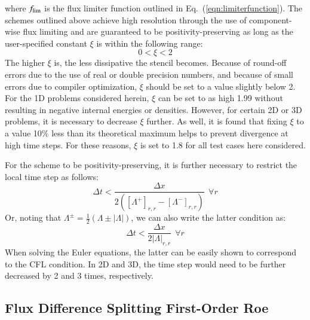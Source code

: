 \documentclass{warpdoc}
\begin{document}
%
where $f_{\rm lim}$ is the flux limiter function outlined in Eq.\ (\ref{eqn:limiterfunction}).
The schemes outlined above achieve high resolution through the use of component-wise flux limiting and are guaranteed to be positivity-preserving as long as the user-specified constant $\xi$ is within the following range:
%
\begin{equation}
0 < \xi < 2
\label{eqn:xi}
\end{equation}
%
The higher $\xi$ is, the less dissipative the stencil becomes. Because of round-off errors due to the use of real or double precision numbers, and because of small errors due to compiler optimization, $\xi$ should be set to a value slightly below 2. For the 1D problems considered herein, $\xi$ can be set to as high 1.99 without resulting in negative internal energies or densities. However, for certain 2D or 3D problems, it is necessary to decrease $\xi$ further. As well, it is found that fixing $\xi$ to a value 10\% less than its theoretical maximum helps to prevent divergence at high time steps. For these reasons,  $\xi$ is set to 1.8 for all test cases here considered.  


For the scheme to be positivity-preserving, it is further necessary to restrict the local time step as follows:
%
\begin{equation}
\Delta t
<
\frac{\Delta x}{   
2 \left(\left[\Lambda^+ \right]_{r,r}-\left[\Lambda^- \right]_{r,r}\right)
}~~\forall r
\end{equation}
%
Or, noting that $\Lambda^\pm=\frac{1}{2} (\Lambda \pm |\Lambda|)$, we can also write the latter condition as:
%
\begin{equation}
\Delta t
<
\frac{\Delta x}{   
2 \left|\Lambda \right|_{r,r}
}~~\forall r
\end{equation}
%
When solving the Euler equations, the latter can be easily shown to correspond to the CFL condition. In 2D and 3D, the time step would need to be further decreased by 2 and 3 times, respectively.




\subsection{Flux Difference Splitting First-Order Roe}
\end{document}
